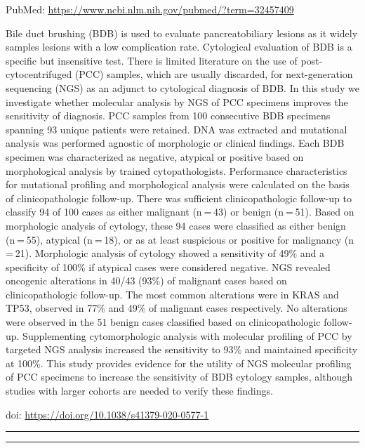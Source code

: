 \documentclass[
]{article}
\begin{document}
PubMed: \url{https://www.ncbi.nlm.nih.gov/pubmed/?term=32457409}

Bile duct brushing (BDB) is used to evaluate pancreatobiliary lesions as
it widely samples lesions with a low complication rate. Cytological
evaluation of BDB is a specific but insensitive test. There is limited
literature on the use of post-cytocentrifuged (PCC) samples, which are
usually discarded, for next-generation sequencing (NGS) as an adjunct to
cytological diagnosis of BDB. In this study we investigate whether
molecular analysis by NGS of PCC specimens improves the sensitivity of
diagnosis. PCC samples from 100 consecutive BDB specimens spanning 93
unique patients were retained. DNA was extracted and mutational analysis
was performed agnostic of morphologic or clinical findings. Each BDB
specimen was characterized as negative, atypical or positive based on
morphological analysis by trained cytopathologists. Performance
characteristics for mutational profiling and morphological analysis were
calculated on the basis of clinicopathologic follow-up. There was
sufficient clinicopathologic follow-up to classify 94 of 100 cases as
either malignant (n = 43) or benign (n = 51). Based on morphologic
analysis of cytology, these 94 cases were classified as either benign
(n = 55), atypical (n = 18), or as at least suspicious or positive for
malignancy (n = 21). Morphologic analysis of cytology showed a
sensitivity of 49\% and a specificity of 100\% if atypical cases were
considered negative. NGS revealed oncogenic alterations in 40/43 (93\%)
of malignant cases based on clinicopathologic follow-up. The most common
alterations were in KRAS and TP53, observed in 77\% and 49\% of
malignant cases respectively. No alterations were observed in the 51
benign cases classified based on clinicopathologic follow-up.
Supplementing cytomorphologic analysis with molecular profiling of PCC
by targeted NGS analysis increased the sensitivity to 93\% and
maintained specificity at 100\%. This study provides evidence for the
utility of NGS molecular profiling of PCC specimens to increase the
sensitivity of BDB cytology samples, although studies with larger
cohorts are needed to verify these findings.

doi: \url{https://doi.org/10.1038/s41379-020-0577-1}

\begin{center}\rule{0.5\linewidth}{0.5pt}\end{center}

\begin{center}\rule{0.5\linewidth}{0.5pt}\end{center}
\end{document}
